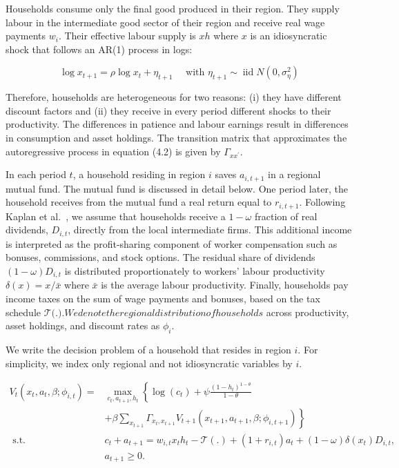 \documentclass[\latexroot/\projectname]{subfiles}
\begin{document}
Households consume only the final good produced in their region. They supply labour in the intermediate good sector of their region and receive real wage payments $w_{i}$. Their effective labour supply is $x h$ where $x$ is an idiosyncratic shock that follows an AR(1) process in logs:


\begin{equation*}
\log x_{t+1}=\rho \log x_{t}+\eta_{t+1} \quad \text { with } \eta_{t+1} \sim \operatorname{iid} N\left(0, \sigma_{\eta}^{2}\right) \tag{4.2}
\end{equation*}


Therefore, households are heterogeneous for two reasons: (i) they have different discount factors and (ii) they receive in every period different shocks to their productivity. The differences in patience and labour earnings result in differences in consumption and asset holdings. The transition matrix that approximates the autoregressive process in equation (4.2) is given by $\Gamma_{x x^{\prime}}$.

In each period $t$, a household residing in region $i$ saves $a_{i, t+1}$ in a regional mutual fund. The mutual fund is discussed in detail below. One period later, the household receives from the mutual fund a real return equal to $r_{i, t+1}$. Following Kaplan et al.~\cite{Kaplan2018-sr}, we assume that households receive a $1-\omega$ fraction of real dividends, $D_{i, t}$, directly from the local intermediate firms. This additional income is interpreted as the profit-sharing component of worker compensation such as bonuses, commissions, and stock options. The residual share of dividends $(1-\omega) D_{i, t}$ is distributed proportionately to workers' labour productivity $\delta(x)=x / \bar{x}$ where $\bar{x}$ is the average labour productivity. Finally, households pay income taxes on the sum of wage payments and bonuses, based on the tax schedule $\mathcal{T}($.$) . We denote the regional distribution of households$ across productivity, asset holdings, and discount rates as $\phi_{i}$.

We write the decision problem of a household that resides in region $i$. For simplicity, we index only regional and not idiosyncratic variables by $i$.


\begin{align*}
V_{t}\left(x_{t}, a_{t}, \beta ; \phi_{i, t}\right)= & \max _{c_{t}, a_{t+1}, h_{t}}\left\{\log \left(c_{t}\right)+\psi \frac{\left(1-h_{t}\right)^{1-\theta}}{1-\theta}\right. \\
& \left.+\beta \sum_{x_{t+1}} \Gamma_{x_{t}, x_{t+1}} V_{t+1}\left(x_{t+1}, a_{t+1}, \beta ; \phi_{i, t+1}\right)\right\}  \tag{4.3}\\
\text { s.t. } \quad & c_{t}+a_{t+1}=w_{i, t} x_{t} h_{t}-\mathcal{T}(.)+\left(1+r_{i, t}\right) a_{t}+(1-\omega) \delta\left(x_{t}\right) D_{i, t},  \tag{4.4}\\
& a_{t+1} \geq 0 . \tag{4.5}
\end{align*}
\end{document}
